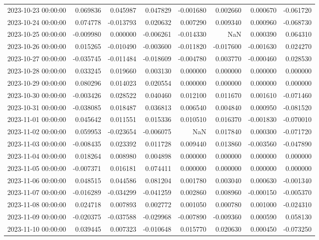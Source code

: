\begin{tabular}{lrrrrrrr}
2023-10-23 00:00:00 & 0.069836 & 0.045987 & 0.047829 & -0.001680 & 0.002660 & 0.000670 & -0.061720 \\
2023-10-24 00:00:00 & 0.074778 & -0.013793 & 0.020632 & 0.007290 & 0.009340 & 0.000960 & -0.068730 \\
2023-10-25 00:00:00 & -0.009980 & 0.000000 & -0.006261 & -0.014330 & NaN & 0.000390 & 0.064310 \\
2023-10-26 00:00:00 & 0.015265 & -0.010490 & -0.003600 & -0.011820 & -0.017600 & -0.001630 & 0.024270 \\
2023-10-27 00:00:00 & -0.035745 & -0.011484 & -0.018609 & -0.004780 & 0.003770 & -0.000460 & 0.028530 \\
2023-10-28 00:00:00 & 0.033245 & 0.019660 & 0.003130 & 0.000000 & 0.000000 & 0.000000 & 0.000000 \\
2023-10-29 00:00:00 & 0.080296 & 0.014023 & 0.020554 & 0.000000 & 0.000000 & 0.000000 & 0.000000 \\
2023-10-30 00:00:00 & -0.003426 & 0.028522 & 0.040460 & 0.012100 & 0.011670 & 0.001610 & -0.071460 \\
2023-10-31 00:00:00 & -0.038085 & 0.018487 & 0.036813 & 0.006540 & 0.004840 & 0.000950 & -0.081520 \\
2023-11-01 00:00:00 & 0.045642 & 0.011551 & 0.015336 & 0.010510 & 0.016370 & -0.001830 & -0.070010 \\
2023-11-02 00:00:00 & 0.059953 & -0.023654 & -0.006075 & NaN & 0.017840 & 0.000300 & -0.071720 \\
2023-11-03 00:00:00 & -0.008435 & 0.023392 & 0.011728 & 0.009440 & 0.013860 & -0.003560 & -0.047890 \\
2023-11-04 00:00:00 & 0.018264 & 0.008980 & 0.004898 & 0.000000 & 0.000000 & 0.000000 & 0.000000 \\
2023-11-05 00:00:00 & -0.007371 & 0.016181 & 0.074411 & 0.000000 & 0.000000 & 0.000000 & 0.000000 \\
2023-11-06 00:00:00 & 0.048515 & 0.044586 & 0.081204 & 0.001780 & 0.003040 & 0.000630 & -0.001340 \\
2023-11-07 00:00:00 & -0.016289 & -0.034299 & -0.041259 & 0.002860 & 0.008960 & -0.000150 & -0.005370 \\
2023-11-08 00:00:00 & 0.024718 & 0.007893 & 0.002772 & 0.001050 & 0.000780 & 0.001000 & -0.024310 \\
2023-11-09 00:00:00 & -0.020375 & -0.037588 & -0.029968 & -0.007890 & -0.009360 & 0.000590 & 0.058130 \\
2023-11-10 00:00:00 & 0.039445 & 0.007323 & -0.010648 & 0.015770 & 0.020630 & 0.000450 & -0.073250 \\

\end{tabular}
